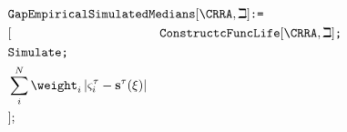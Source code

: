     \begin{equation}\begin{gathered}\begin{aligned}
      \lefteqn{    \texttt{GapEmpiricalSimulatedMedians$[\CRRA,\beth]$:=}}      \\
                                                                           &[&\texttt{ConstructcFuncLife$[\CRRA,\beth]$;} \\
                                                                           &\texttt{Simulate;} \\
                                                                           &\sum\limits_{i}^{N}\weight _{i}\left|\varsigma_{i}^{\tau }-\mathbf{s}^{\tau}(\xi )\right|  \\
                                                                           &];&
    \end{aligned}\end{gathered}\end{equation}
  
